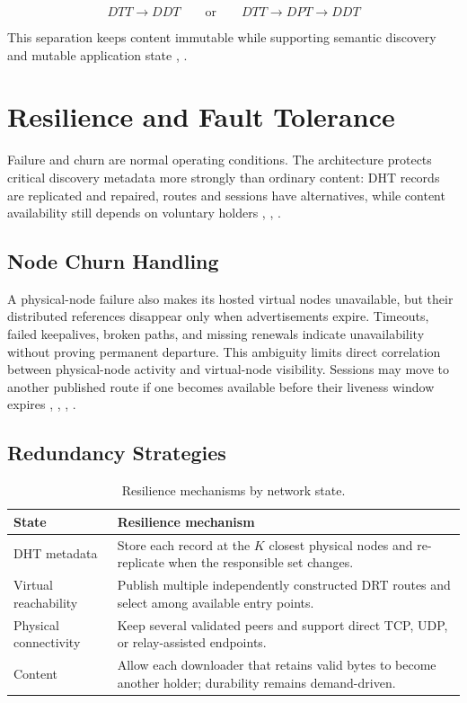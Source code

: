 \documentclass[
  12pt,
  oneside,
  a4paper,
  chapter=TITLE,
  section=TITLE,
  english,
  brazil
]{abntex2}
\begin{document}
\[
DTT \rightarrow DDT
\qquad\text{or}\qquad
DTT \rightarrow DPT \rightarrow DDT
\]

This separation keeps content immutable while supporting semantic discovery and
mutable application state \cite{augustine2022byzantine}, \cite{qian2016garlic}.



\section{Resilience and Fault Tolerance}

Failure and churn are normal operating conditions. The architecture protects critical
discovery metadata more strongly than ordinary content: DHT records are replicated
and repaired, routes and sessions have alternatives, while content availability still
depends on voluntary holders \cite{tosic2022spatial}, \cite{augustine2022byzantine}, \cite{qian2016garlic}.

\subsection{Node Churn Handling}

A physical-node failure also makes its hosted virtual nodes unavailable, but their
distributed references disappear only when advertisements expire. Timeouts, failed
keepalives, broken paths, and missing renewals indicate unavailability without proving
permanent departure. This ambiguity limits direct correlation between physical-node
activity and virtual-node visibility. Sessions may move to another published route if
one becomes available before their liveness window expires \cite{li2022unreachable}, \cite{augustine2022byzantine}, \cite{mirzaei2018pk}, \cite{qian2016garlic}.

\subsection{Redundancy Strategies}

\begin{table}[H]
\centering
\caption{Resilience mechanisms by network state.}
\label{tab:resilience-mechanisms}
\begin{tabularx}{\textwidth}{L{0.24\textwidth} Y}
\toprule
\textbf{State} & \textbf{Resilience mechanism} \\
\midrule
DHT metadata & Store each record at the $K$ closest physical nodes and re-replicate
when the responsible set changes. \\
Virtual reachability & Publish multiple independently constructed DRT routes and
select among available entry points. \\
Physical connectivity & Keep several validated peers and support direct TCP, UDP,
or relay-assisted endpoints. \\
Content & Allow each downloader that retains valid bytes to become another holder;
durability remains demand-driven. \\
\bottomrule
\end{tabularx}
\end{table}
\end{document}
